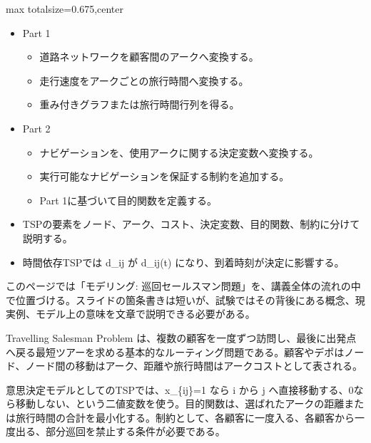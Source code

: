 \clearpage
{}
\begin{adjustbox}{max totalsize={\textwidth}{0.675\textheight},center}
\begin{minipage}{\textwidth}\scriptsize
\begin{minipage}[t]{0.485\textwidth}
\begin{itemize}
\item Part 1
\begin{itemize}
\item 道路ネットワークを顧客間のアークへ変換する。
\item 走行速度をアークごとの旅行時間へ変換する。
\item 重み付きグラフまたは旅行時間行列を得る。
\end{itemize}
\item Part 2
\begin{itemize}
\item ナビゲーションを、使用アークに関する決定変数へ変換する。
\item 実行可能なナビゲーションを保証する制約を追加する。
\item Part 1に基づいて目的関数を定義する。
\end{itemize}
\end{itemize}
\begin{itemize}
\item TSPの要素をノード、アーク、コスト、決定変数、目的関数、制約に分けて説明する。
\item 時間依存TSPでは d\_ij が d\_ij(t) になり、到着時刻が決定に影響する。
\end{itemize}
\end{minipage}\hfill
\begin{minipage}[t]{0.485\textwidth}
このページでは「モデリング: 巡回セールスマン問題」を、講義全体の流れの中で位置づける。スライドの箇条書きは短いが、試験ではその背後にある概念、現実例、モデル上の意味を文章で説明できる必要がある。\par
Travelling Salesman Problem は、複数の顧客を一度ずつ訪問し、最後に出発点へ戻る最短ツアーを求める基本的なルーティング問題である。顧客やデポはノード、ノード間の移動はアーク、距離や旅行時間はアークコストとして表される。\par
意思決定モデルとしてのTSPでは、x\_\{ij\}=1 なら i から j へ直接移動する、0なら移動しない、という二値変数を使う。目的関数は、選ばれたアークの距離または旅行時間の合計を最小化する。制約として、各顧客に一度入る、各顧客から一度出る、部分巡回を禁止する条件が必要である。\par

\end{minipage}
\end{minipage}
\end{adjustbox}
